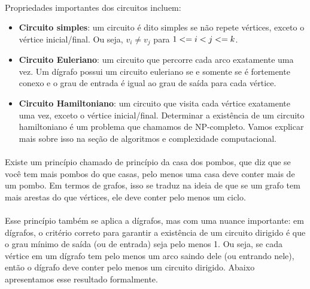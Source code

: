 \documentclass[12pt,a4paper]{article}
\def\leq{\string<=}%
\begin{document}
\paragraph{}
Propriedades importantes dos circuitos incluem:
\begin{itemize}
    \item \textbf{Circuito simples}: um circuito é dito simples se não repete vértices, exceto o vértice inicial/final. Ou seja, \(v_i \neq v_j\) para \(1 \leq i < j \leq k\).
    \item \textbf{Circuito Euleriano}: um circuito que percorre cada arco exatamente uma vez. Um dígrafo possui um circuito euleriano se e somente se é fortemente conexo e o grau de entrada é igual ao grau de saída para cada vértice.
    \item \textbf{Circuito Hamiltoniano}: um circuito que visita cada vértice exatamente uma vez, exceto o vértice inicial/final. Determinar a existência de um circuito hamiltoniano é um problema que chamamos de NP-completo. Vamos explicar mais sobre isso na seção de algoritmos e complexidade computacional.
\end{itemize}       

\paragraph{}
Existe um princípio chamado de princípio da casa dos pombos, que diz que se você tem mais pombos do que casas, pelo menos uma casa deve conter mais de um pombo. Em termos de grafos, isso se traduz na ideia de que se um grafo tem mais arestas do que vértices, ele deve conter pelo menos um ciclo.

\paragraph{}
Esse princípio também se aplica a dígrafos, mas com uma nuance importante: em dígrafos, o critério correto para garantir a existência de um circuito dirigido é que o grau mínimo de saída (ou de entrada) seja pelo menos 1. Ou seja, se cada vértice em um dígrafo tem pelo menos um arco saindo dele (ou entrando nele), então o dígrafo deve conter pelo menos um circuito dirigido. Abaixo apresentamos esse resultado formalmente.
\end{document}
